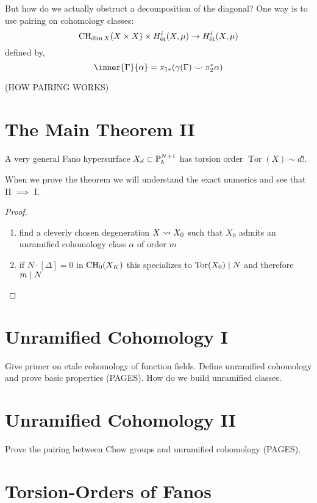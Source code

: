 \documentclass[12pt]{article}
\DeclareMathOperator{\torsion}{\mathrm{Tor}}
\begin{document}
But how do we actually obstruct a decomposition of the diagonal? One way is to use pairing on \etale cohomology classes:
\[ \CH_{\dim{X}}(X \times X) \times H_{\et}^i(X, \mu) \to H_{\et}^i(X, \mu) \]
defined by,
\[ \inner{\Gamma}{\alpha} = \pi_{1*}(\gamma(\Gamma) \smile \pi_2^* \alpha) \]

(HOW PAIRING WORKS)


\section{The Main Theorem II}

\begin{theorem}[Schreieder II]
A very general Fano hypersurface $X_d \subset \P^{N+1}_k$ has torsion order $\torsion(X) \sim d!$. 
\end{theorem}

\begin{rmk}
When we prove the theorem we will understand the exact numerics and see that II $\implies$ I.
\end{rmk}

\begin{proof}
\begin{enumerate}
\item find a cleverly chosen degeneration $X \spto X_0$ such that $X_0$ admits an unramified cohomology class $\alpha$ of order $m$

\item if $N \cdot [\Delta] = 0$ in $\CH_0(X_K)$ this specializes to $\torsion(X_0) \divides N$ and therefore $m \divides N$
\end{enumerate}
\end{proof}

\section{Unramified Cohomology I}

Give primer on etale cohomology of function fields. Define unramified cohomology and prove basic properties (PAGES). How do we build unramified classes.

\section{Unramified Cohomology II}

Prove the pairing between Chow groups and unramified cohomology (PAGES). 

\section{Torsion-Orders of Fanos}
\end{document}
